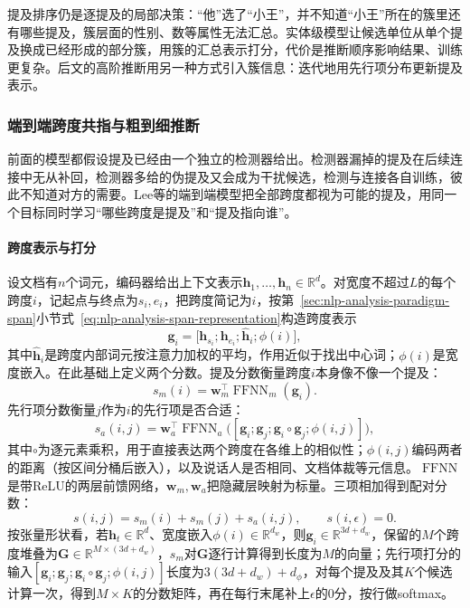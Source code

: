 提及排序仍是逐提及的局部决策：“他”选了“小王”，并不知道“小王”所在的簇里还有哪些提及，簇层面的性别、数等属性无法汇总。实体级模型让候选单位从单个提及换成已经形成的部分簇，用簇的汇总表示打分，代价是推断顺序影响结果、训练更复杂。后文的高阶推断用另一种方式引入簇信息：迭代地用先行项分布更新提及表示。

\subsubsection{端到端跨度共指与粗到细推断}
\label{sec:nlp-analysis-span-coreference}

前面的模型都假设提及已经由一个独立的检测器给出。检测器漏掉的提及在后续连接中无从补回，检测器多给的伪提及又会成为干扰候选，检测与连接各自训练，彼此不知道对方的需要。Lee等的端到端模型把全部跨度都视为可能的提及，用同一个目标同时学习“哪些跨度是提及”和“提及指向谁”。

\paragraph{跨度表示与打分}
设文档有$n$个词元，编码器给出上下文表示$\bm h_1,\ldots,\bm h_n\in\mathbb R^{d}$。对宽度不超过$L$的每个跨度$i$，记起点与终点为$s_i,e_i$，把跨度简记为$i$，按第~\ref{sec:nlp-analysis-paradigm-span}小节式~\eqref{eq:nlp-analysis-span-representation}构造跨度表示
\[
  \bm g_i=\bigl[\bm h_{s_i};\bm h_{e_i};\hat{\bm h}_i;\phi(i)\bigr],
\]
其中$\hat{\bm h}_i$是跨度内部词元按注意力加权的平均，作用近似于找出中心词；$\phi(i)$是宽度嵌入。在此基础上定义两个分数。提及分数衡量跨度$i$本身像不像一个提及：
\begin{equation}
  s_m(i)=\bm w_m^{\top}\operatorname{FFNN}_m(\bm g_i).
  \label{eq:nlp-analysis-mention-score}
\end{equation}
先行项分数衡量$j$作为$i$的先行项是否合适：
\begin{equation}
  s_a(i,j)=\bm w_a^{\top}\operatorname{FFNN}_a\bigl([\bm g_i;\bm g_j;\bm g_i\circ\bm g_j;\phi(i,j)]\bigr),
  \label{eq:nlp-analysis-antecedent-score}
\end{equation}
其中$\circ$为逐元素乘积，用于直接表达两个跨度在各维上的相似性；$\phi(i,j)$编码两者的距离（按区间分桶后嵌入），以及说话人是否相同、文档体裁等元信息。$\operatorname{FFNN}$是带ReLU的两层前馈网络，$\bm w_m,\bm w_a$把隐藏层映射为标量。三项相加得到配对分数：
\begin{equation}
  s(i,j)=s_m(i)+s_m(j)+s_a(i,j),\qquad s(i,\epsilon)=0.
  \label{eq:nlp-analysis-span-coreference-score}
\end{equation}
按张量形状看，若$\bm h_t\in\mathbb R^{d}$、宽度嵌入$\phi(i)\in\mathbb R^{d_w}$，则$\bm g_i\in\mathbb R^{3d+d_w}$，保留的$M$个跨度堆叠为$\bm G\in\mathbb R^{M\times(3d+d_w)}$，$s_m$对$\bm G$逐行计算得到长度为$M$的向量；先行项打分的输入$[\bm g_i;\bm g_j;\bm g_i\circ\bm g_j;\phi(i,j)]$长度为$3(3d+d_w)+d_\phi$，对每个提及及其$K$个候选计算一次，得到$M\times K$的分数矩阵，再在每行末尾补上$\epsilon$的0分，按行做softmax。

